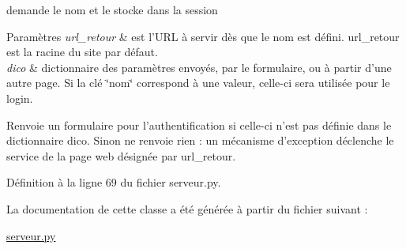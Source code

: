 demande le nom et le stocke dans la session 


\begin{DoxyParams}{Paramètres}
{\em url\-\_\-retour} & est l'U\-R\-L à servir dès que le nom est défini. url\-\_\-retour est la racine du site par défaut. \\
\hline
{\em dico} & dictionnaire des paramètres envoyés, par le formulaire, ou à partir d'une autre page. Si la clé \char`\"{}nom\char`\"{} correspond à une valeur, celle-\/ci sera utilisée pour le login. \\
\hline
\end{DoxyParams}
\begin{DoxyReturn}{Renvoie}
un formulaire pour l'authentification si celle-\/ci n'est pas définie dans le dictionnaire dico. Sinon ne renvoie rien \-: un mécanisme d'exception déclenche le service de la page web désignée par url\-\_\-retour. 
\end{DoxyReturn}


Définition à la ligne 69 du fichier serveur.\-py.



La documentation de cette classe a été générée à partir du fichier suivant \-:\begin{DoxyCompactItemize}
\item 
\hyperlink{serveur_8py}{serveur.\-py}\end{DoxyCompactItemize}
